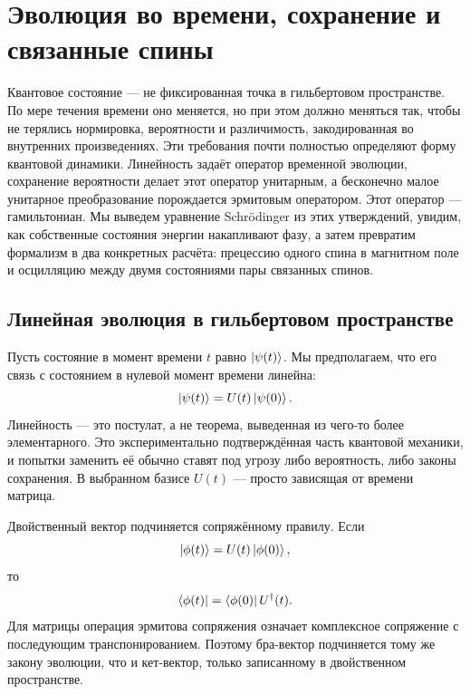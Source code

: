 \chapter{Эволюция во времени, сохранение и связанные спины}

Квантовое состояние — не фиксированная точка в гильбертовом пространстве. По мере течения времени оно меняется, но при этом должно меняться так, чтобы не терялись нормировка, вероятности и различимость, закодированная во внутренних произведениях. Эти требования почти полностью определяют форму квантовой динамики. Линейность задаёт оператор временной эволюции, сохранение вероятности делает этот оператор унитарным, а бесконечно малое унитарное преобразование порождается эрмитовым оператором. Этот оператор — гамильтониан. Мы выведем уравнение Schr\"odinger из этих утверждений, увидим, как собственные состояния энергии накапливают фазу, а затем превратим формализм в два конкретных расчёта: прецессию одного спина в магнитном поле и осцилляцию между двумя состояниями пары связанных спинов.

\section{Линейная эволюция в гильбертовом пространстве}

Пусть состояние в момент времени \(t\) равно \(\left\lvert\psi(t)\right\rangle\). Мы предполагаем, что его связь с состоянием в нулевой момент времени линейна:
\begin{equation}
\left\lvert\psi(t)\right\rangle=U(t)\left\lvert\psi(0)\right\rangle.
\end{equation}
Линейность — это постулат, а не теорема, выведенная из чего-то более элементарного. Это экспериментально подтверждённая часть квантовой механики, и попытки заменить её обычно ставят под угрозу либо вероятность, либо законы сохранения. В выбранном базисе \(U(t)\) — просто зависящая от времени матрица.

Двойственный вектор подчиняется сопряжённому правилу. Если
\begin{equation}
\left\lvert\phi(t)\right\rangle=U(t)\left\lvert\phi(0)\right\rangle,
\end{equation}
то
\begin{equation}
\left\langle\phi(t)\right\rvert=\left\langle\phi(0)\right\rvert U^\dagger(t).
\end{equation}
Для матрицы операция эрмитова сопряжения означает комплексное сопряжение с последующим транспонированием. Поэтому бра-вектор подчиняется тому же закону эволюции, что и кет-вектор, только записанному в двойственном пространстве.

